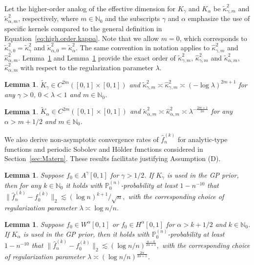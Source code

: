 \documentclass[12pt]{article}
\newcommand{\PP}{\mathbb{P}}
\theoremstyle{plain}
\newtheorem{lemma}[theorem]{Lemma}
\theoremstyle{nonitalicremark}
\begin{document}
Let the higher-order analog of the effective dimension for $K_\gamma$ and $K_\alpha$ be $\tilde{\kappa}_{\gamma,m}^2$ and $\tilde{\kappa}_{\alpha,m}^2$, respectively, where $m\in\mathbb{N}_0$ and the subscripts $\gamma$ and $\alpha$ emphasize the use of specific kernels compared to the general definition in Equation~\eqref{eq:high.order.kappa}. Note that we allow $m=0$, which corresponds to $\tilde{\kappa}_{\gamma,0}^2=\tilde{\kappa}_{\gamma}^2$ and $\tilde{\kappa}_{\alpha,0}^2=\tilde{\kappa}_{\alpha}^2$. The same convention in notation applies to $\hat{\kappa}_{\gamma,m}^2$ and $\hat{\kappa}_{\alpha,m}^2$. Lemma~\ref{lem:differentiability.exp} and Lemma~\ref{lem:differentiability.matern} provide the exact order of $\tilde{\kappa}_{\gamma,m}^2$, $\hat{\kappa}_{\gamma,m}^2$ and $\tilde{\kappa}_{\alpha,m}^2$, $\hat{\kappa}_{\alpha,m}^2$ with respect to the regularization parameter $\lambda$.

\begin{lemma}\label{lem:differentiability.exp}
$\tilde K_\gamma\in C^{2m}([0,1]\times[0,1])$ and $\tilde{\kappa}_{\gamma,m}^2 \asymp \hat{\kappa}_{\gamma,m}^2 \asymp (-\log \lambda)^{2m+1}$ for any $\gamma>0$, $0<\lambda<1$ and $m\in\mathbb{N}_0$.
\end{lemma}

\begin{lemma}\label{lem:differentiability.matern}
$\tilde K_\alpha\in C^{2m}([0,1]\times[0,1])$ and $\tilde{\kappa}_{\alpha,m}^2 \asymp \hat{\kappa}_{\alpha,m}^2 \asymp \lambda^{-\frac{2m+1}{2\alpha}}$ for any $\alpha>m+1/2$ and $m\in\mathbb{N}_0$.
\end{lemma}


We also derive non-asymptotic convergence rates of $\hat{f}_n^{(k)}$ for analytic-type functions and periodic Sobolev and H\"older functions considered in Section~\ref{sec:Matern}. These results facilitate justifying Assumption (D).



\begin{lemma}\label{thm:minimax.diff.exp}
Suppose $f_0\in A^\gamma[0,1]$ for $\gamma>1/2$. If $K_\gamma$ is used in the GP prior, then for any $k\in\mathbb{N}_0$ it holds with $\PP_0^{(n)}$-probability at least $1-n^{-10}$ that
$
\|\hat{f}_n^{(k)}-f_0^{(k)}\|_2\lesssim {(\log n)^{k+1}}/{\sqrt{n}},
$
with the corresponding choice of regularization parameter $\lambda\asymp \log n/n$.
\end{lemma}

\begin{lemma}\label{thm:minimax.diff.matern}
Suppose $f_0 \in W^\alpha[0,1]$ or $f_0\in H^{\alpha}[0,1]$ for $\alpha>k+1/2$ and $k\in\mathbb{N}_0$. If $K_\alpha$ is used in the GP prior, then it holds with $\PP_0^{(n)}$-probability at least $1-n^{-10}$ that
$
\|\hat{f}_n^{(k)}-f_0^{(k)}\|_2\lesssim \left({\log n}/{n}\right)^{\frac{\alpha-k}{2\alpha+1}},
$
with the corresponding choice of regularization parameter $\lambda\asymp ({\log n}/{n})^{\frac{2\alpha}{2\alpha+1}}$.
\end{lemma}
\end{document}
